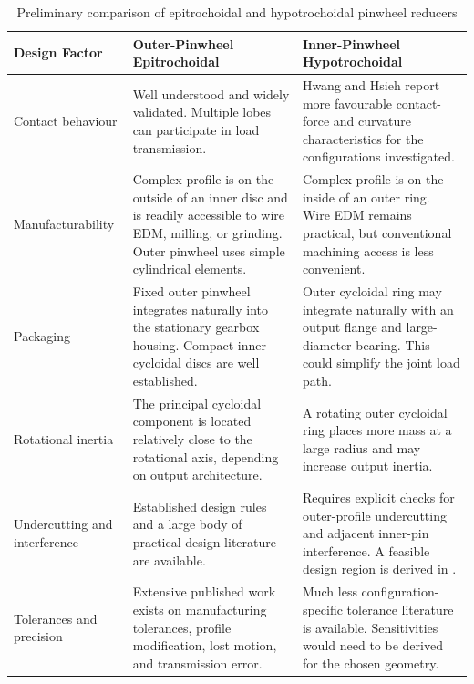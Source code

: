 \documentclass[internal]{../../../classes/nervtech-research}
\begin{document}
\begin{table}[H]
  \centering
  \small
  \caption{Preliminary comparison of epitrochoidal and hypotrochoidal pinwheel reducers}
  \label{tab:epi_hypo_comparison}
  \begin{tabular}{p{} p{} p{}}
    \hline
    \textbf{Design Factor} &
    \textbf{Outer-Pinwheel Epitrochoidal} &
    \textbf{Inner-Pinwheel Hypotrochoidal} \\
    \hline

    Contact behaviour &
    Well understood and widely validated.
    Multiple lobes can participate in load transmission. &
    Hwang and Hsieh report more favourable contact-force and curvature
    characteristics for the configurations investigated. \\

    Manufacturability &
    Complex profile is on the outside of an inner disc and is readily
    accessible to wire EDM, milling, or grinding.
    Outer pinwheel uses simple cylindrical elements. &
    Complex profile is on the inside of an outer ring.
    Wire EDM remains practical, but conventional machining access is less
    convenient. \\

    Packaging &
    Fixed outer pinwheel integrates naturally into the stationary gearbox
    housing.
    Compact inner cycloidal discs are well established. &
    Outer cycloidal ring may integrate naturally with an output flange and
    large-diameter bearing.
    This could simplify the joint load path. \\

    Rotational inertia &
    The principal cycloidal component is located relatively close to the
    rotational axis, depending on output architecture. &
    A rotating outer cycloidal ring places more mass at a large radius and
    may increase output inertia. \\

    Undercutting and interference &
    Established design rules and a large body of practical design literature
    are available. &
    Requires explicit checks for outer-profile undercutting and adjacent
    inner-pin interference.
    A feasible design region is derived in
    \cite{HypotrochoidalNonUndercutting}. \\

    Tolerances and precision &
    Extensive published work exists on manufacturing tolerances, profile
    modification, lost motion, and transmission error. &
    Much less configuration-specific tolerance literature is available.
    Sensitivities would need to be derived for the chosen geometry. \\


\end{tabular}
\end{table}
\end{document}
